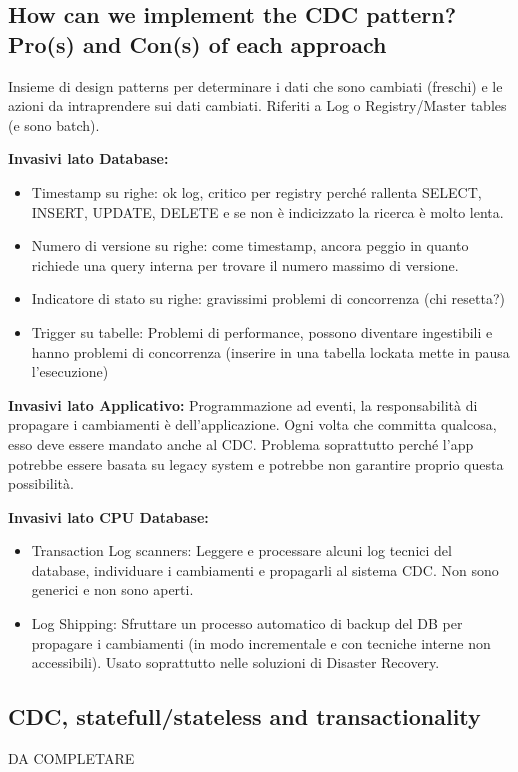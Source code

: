 \documentclass{article}
\begin{document}
\subsection{How can we implement the CDC pattern? Pro(s) and Con(s) of each approach}
Insieme di design patterns per determinare i dati che sono cambiati (freschi) e le azioni da intraprendere sui dati cambiati. Riferiti a Log o Registry/Master tables (e sono batch).

\textbf{Invasivi lato Database:}
\begin{itemize}
    \item Timestamp su righe: ok log, critico per registry perché rallenta SELECT, INSERT, UPDATE, DELETE e se non è indicizzato la ricerca è molto lenta.
    \item Numero di versione su righe: come timestamp, ancora peggio in quanto richiede una query interna per trovare il numero massimo di versione.
    \item Indicatore di stato su righe: gravissimi problemi di concorrenza (chi resetta?)
    \item Trigger su tabelle: Problemi di performance, possono diventare ingestibili e hanno problemi di concorrenza (inserire in una tabella lockata mette in pausa l’esecuzione)
\end{itemize}

\textbf{Invasivi lato Applicativo:} Programmazione ad eventi, la responsabilità di propagare i cambiamenti è dell'applicazione. Ogni volta che committa qualcosa, esso deve essere mandato anche al CDC. Problema soprattutto perché l'app potrebbe essere basata su legacy system e potrebbe non garantire proprio questa possibilità.

\textbf{Invasivi lato CPU Database:}
\begin{itemize}
    \item Transaction Log scanners: Leggere e processare alcuni log tecnici del database, individuare i cambiamenti e propagarli al sistema CDC. Non sono generici e non sono aperti.
    \item Log Shipping: Sfruttare un processo automatico di backup del DB per propagare i cambiamenti (in modo incrementale e con tecniche interne non accessibili). Usato soprattutto nelle soluzioni di Disaster Recovery.
\end{itemize}

\subsection{CDC, statefull/stateless and transactionality}
DA COMPLETARE
\end{document}
